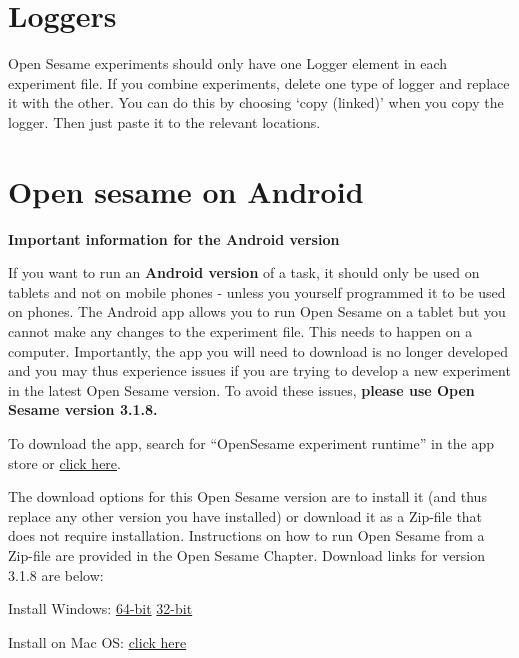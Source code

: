 \documentclass[
]{book}
\begin{document}
\hypertarget{loggers}{%
\section{Loggers}\label{loggers}}

Open Sesame experiments should only have one Logger element in each experiment file. If you combine experiments, delete one type of logger and replace it with the other. You can do this by choosing `copy (linked)' when you copy the logger. Then just paste it to the relevant locations.

\hypertarget{open-sesame-on-android}{%
\section{Open sesame on Android}\label{open-sesame-on-android}}

\textbf{Important information for the Android version}

If you want to run an \textbf{Android version} of a task, it should only be used on tablets and not on mobile phones - unless you yourself programmed it to be used on phones. The Android app allows you to run Open Sesame on a tablet but you cannot make any changes to the experiment file. This needs to happen on a computer. Importantly, the app you will need to download is no longer developed and you may thus experience issues if you are trying to develop a new experiment in the latest Open Sesame version. To avoid these issues, \textbf{please use Open Sesame version 3.1.8.}

To download the app, search for ``OpenSesame experiment runtime'' in the app store or \href{https://play.google.com/store/apps/details?id=nl.cogsci.opensesame}{click here}.

The download options for this Open Sesame version are to install it (and thus replace any other version you have installed) or download it as a Zip-file that does not require installation. Instructions on how to run Open Sesame from a Zip-file are provided in the Open Sesame Chapter. Download links for version 3.1.8 are below:

Install Windows:
\href{https://github.com/smathot/OpenSesame/releases/download/release\%2F3.1.8/opensesame_3.1.8-py3.5-win64-1.exe}{64-bit}
\href{https://github.com/smathot/OpenSesame/releases/download/release\%2F3.1.8/opensesame_3.1.8-py2.7-win32-1.exe}{32-bit}

Install on Mac OS: \href{https://github.com/smathot/OpenSesame/releases/download/release\%2F3.1.8/opensesame_3.1.8-py2.7-macos-1.dmg}{click here}
\end{document}
